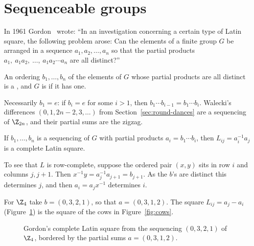 \section{Sequenceable groups}\label{sec:sequenceable}


In 1961 Gordon~\cite{gor61} wrote: ``In an investigation concerning a certain type of Latin square, the following problem arose: Can the elements of a finite group $G$ be arranged in a sequence $a_1,a_2,\dots,a_n$ so that the partial products $a_1,\ a_1a_2,\ \dots,\ a_1a_2\cdots a_n$ are all distinct?''

\begin{definition}\label{def:sequencing}
An ordering $b_1,\dots,b_n$ of the elements of $G$ whose partial products are all distinct is a , and $G$ is  if it has one.
\end{definition}

Necessarily $b_1=e$: if $b_i=e$ for some $i>1$, then $b_1\cdots b_{i-1}=b_1\cdots b_i$. Walecki's differences $(0,1,2n-2,3,\dots)$ from Section~\ref{sec:round-dances} are a sequencing of $\Z_{2n}$, and their partial sums are the zigzag.

\begin{theorem}\label{thm:gordon-square}
If $b_1,\dots,b_n$ is a sequencing of $G$ with partial products $a_i=b_1\cdots b_i$, then $L_{ij}=a_i^{-1}a_j$ is a complete Latin square.
\end{theorem}

To see that $L$ is row-complete, suppose the ordered pair $(x,y)$ sits in row $i$ and columns $j,j+1$. Then $x^{-1}y=a_j^{-1}a_{j+1}=b_{j+1}$. As the $b$'s are distinct this determines $j$, and then $a_i=a_jx^{-1}$ determines $i$.

\begin{example}\label{ex:gordon-z4}
For $\Z_4$ take $b=(0,3,2,1)$, so that $a=(0,3,1,2)$. The square $L_{ij}=a_j-a_i$ (Figure~\ref{fig:gordon-square}) is the square of the cows in Figure~\ref{fig:cows}.
\end{example}

\begin{figure}[ht]
\centering

\caption{Gordon's complete Latin square from the sequencing $(0,3,2,1)$ of $\Z_4$, bordered by the partial sums $a=(0,3,1,2)$.}
\label{fig:gordon-square}
\end{figure}


